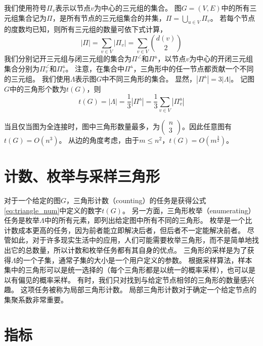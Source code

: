我们使用符号$\Pi_v$表示以节点$v$为中心的三元组的集合。
图$G=(V,E)$中的所有三元组集合记为$\Pi$，是所有节点的三元组集合的并集，$\Pi=\bigcup_{u\in V}\Pi_v$。
若每个节点的度数均已知，则所有三元组的数量可依下式计算，
\begin{equation}
    |\Pi|=\sum_{v\in V}|\Pi_v|=\sum_{v\in V}\binom{d(v)}{2} 
    \label{eq:triple_num}
\end{equation}
我们分别记开三元组与闭三元组的集合为$\Pi^\angle $和$\Pi^\vartriangle $，以节点$v$为中心的开闭三元组集合分别为$\Pi^\angle_v$和$\Pi^\vartriangle_v$。
注意，在集合中$\Pi^\vartriangle $，三角形中的任一节点都贡献一个不同的三元组。
我们使用$\Lambda$表示图$G$中不同三角形的集合。
显然，$|\Pi^\vartriangle|=3|\Lambda|$。
记图$G$中的三角形个数为$t(G)$，则
\begin{equation}
    t(G)=|\Lambda|=\frac{1}{3}|\Pi^\vartriangle|=\frac{1}{3}\sum_{v\in V}|\Pi^\vartriangle_v|
    \label{eq:triangle_num}
\end{equation}

当且仅当图为全连接时，图中三角形数量最多，为$\left(\begin{array}{l}n \\3\end{array}\right)$。因此任意图有$t(G)=O(n^{3})$。
从边的角度考虑，由于$m\le n^{2}$，$t(G)=O(m^{\frac{3}{2}})$。

\section{计数、枚举与采样三角形}

对于一个给定的图$G$，三角形计数（counting）的任务是获得公式\ref{eq:triangle_num}中定义的数字$t(G)$。
另一方面，三角形枚举（enumerating）任务是枚举$\Lambda$中的所有元素，即列出给定图中所有不同的三角形。
枚举是一个比计数成本更高的任务，因为前者能立即解决后者，但后者不一定能解决前者。
尽管如此，对于许多现实生活中的应用，人们可能需要枚举三角形，而不是简单地找出它的总数量，所以计数和枚举任务都有其自身的优点。
三角形的采样是为了获得$\Lambda$的一个子集，通常子集的大小是一个用户定义的参数。
根据采样算法，样本集中的三角形可以是统一选择的（每个三角形都是以统一的概率采样），也可以是以有偏见的概率采样。
有时，我们只对找到与给定节点相邻的三角形的数量感兴趣。
这项任务被称为局部三角形计数。
局部三角形计数对于确定一个给定节点的集聚系数非常重要。

\section{指标}

